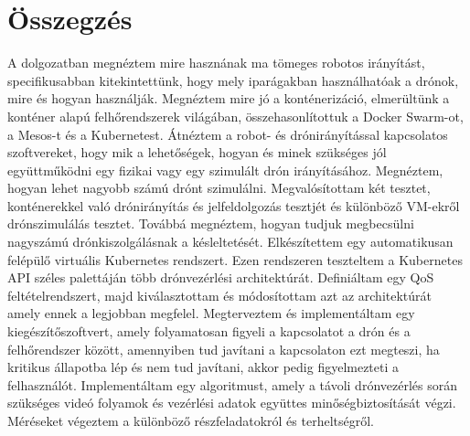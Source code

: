 \chapter*{Összegzés}
A dolgozatban megnéztem mire hasznának ma tömeges robotos irányítást, specifikusabban kitekintettünk, hogy mely iparágakban használhatóak a drónok, mire és hogyan használják. Megnéztem mire jó a konténerizáció, elmerültünk a konténer alapú felhőrendszerek világában, összehasonlítottuk a Docker Swarm-ot, a Mesos-t és a Kubernetest. Átnéztem a robot- és drónirányítással kapcsolatos szoftvereket, hogy mik a lehetőségek, hogyan és minek szükséges jól együttműködni egy fizikai vagy egy szimulált drón irányításához. Megnéztem, hogyan lehet nagyobb számú drónt szimulálni. Megvalósítottam két tesztet, konténerekkel való drónirányítás és jelfeldolgozás tesztjét és különböző VM-ekről drónszimulálás tesztet. Továbbá megnéztem, hogyan tudjuk megbecsülni nagyszámú drónkiszolgálásnak a késleltetését. Elkészítettem egy automatikusan felépülő virtuális Kubernetes rendszert. Ezen rendszeren teszteltem a Kubernetes API széles palettáján több drónvezérlési architektúrát. Definiáltam egy QoS feltételrendszert, majd kiválasztottam és módosítottam azt az architektúrát amely ennek a legjobban megfelel. Megterveztem és implementáltam egy kiegészítőszoftvert, amely folyamatosan figyeli a kapcsolatot a drón és a felhőrendszer között, amennyiben tud javítani a kapcsolaton ezt megteszi, ha kritikus állapotba lép és nem tud javítani, akkor pedig figyelmezteti a felhasználót. Implementáltam egy algoritmust, amely a távoli drónvezérlés során szükséges videó folyamok és vezérlési adatok együttes minőségbiztosítását végzi. Méréseket végeztem a különböző részfeladatokról és terheltségről.